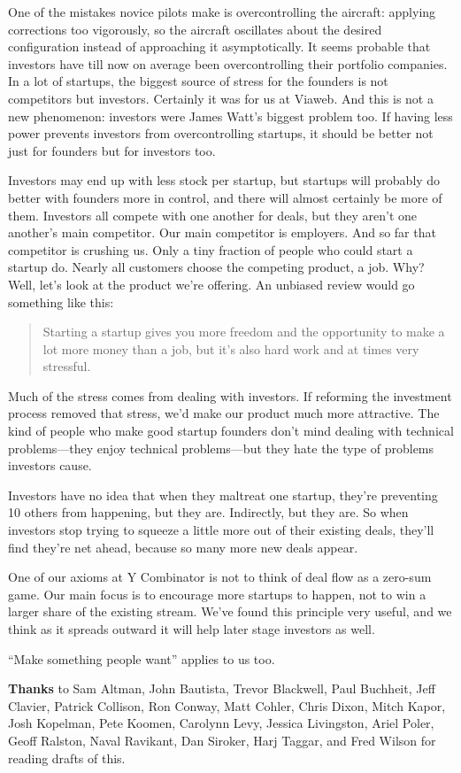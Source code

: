 One of the mistakes novice pilots make is overcontrolling the aircraft:
applying corrections too vigorously, so the aircraft oscillates about
the desired configuration instead of approaching it asymptotically. It
seems probable that investors have till now on average been
overcontrolling their portfolio companies. In a lot of startups, the
biggest source of stress for the founders is not competitors but
investors. Certainly it was for us at Viaweb. And this is not a new
phenomenon: investors were James Watt's biggest problem too. If having
less power prevents investors from overcontrolling startups, it should
be better not just for founders but for investors too.

Investors may end up with less stock per startup, but startups will
probably do better with founders more in control, and there will almost
certainly be more of them. Investors all compete with one another for
deals, but they aren't one another's main competitor. Our main
competitor is employers. And so far that competitor is crushing us. Only
a tiny fraction of people who could start a startup do. Nearly all
customers choose the competing product, a job. Why? Well, let's look at
the product we're offering. An unbiased review would go something like
this:

\begin{quote}
Starting a startup gives you more freedom and the opportunity to make a
lot more money than a job, but it's also hard work and at times very
stressful.
\end{quote}

Much of the stress comes from dealing with investors. If reforming the
investment process removed that stress, we'd make our product much more
attractive. The kind of people who make good startup founders don't mind
dealing with technical problems---they enjoy technical problems---but
they hate the type of problems investors cause.

Investors have no idea that when they maltreat one startup, they're
preventing 10 others from happening, but they are. Indirectly, but they
are. So when investors stop trying to squeeze a little more out of their
existing deals, they'll find they're net ahead, because so many more new
deals appear.

One of our axioms at Y Combinator is not to think of deal flow as a
zero-sum game. Our main focus is to encourage more startups to happen,
not to win a larger share of the existing stream. We've found this
principle very useful, and we think as it spreads outward it will help
later stage investors as well.

``Make something people want'' applies to us too.


\textbf{Thanks} to Sam Altman, John Bautista, Trevor Blackwell, Paul
Buchheit, Jeff Clavier, Patrick Collison, Ron Conway, Matt Cohler, Chris
Dixon, Mitch Kapor, Josh Kopelman, Pete Koomen, Carolynn Levy, Jessica
Livingston, Ariel Poler, Geoff Ralston, Naval Ravikant, Dan Siroker,
Harj Taggar, and Fred Wilson for reading drafts of this.